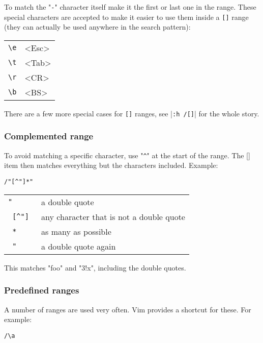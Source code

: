 To match the "\texttt{-}" character itself make it the first or last one in the range.
These special characters are accepted to make it easier to use them inside a \texttt{[]} range (they can actually be used anywhere in the search pattern):

\begin{center} \begin{tabular}{l l}
		\texttt{\textbackslash{}e} & <Esc> \\
		\texttt{\textbackslash{}t} & <Tab> \\
		\texttt{\textbackslash{}r} & <CR>  \\
		\texttt{\textbackslash{}b} & <BS>  \\
\end{tabular} \end{center}

There are a few more special cases for \texttt{[]} ranges, see |\texttt{:h /[]}| for the whole story.
\subsubsection{Complemented range}
To avoid matching a specific character, use "\texttt{\^{}}" at the start of the range.
The [] item then matches everything but the characters included.
Example:

\begin{Verbatim}[samepage=true]
 /"[^"]*"
\end{Verbatim}

\begin{center} \begin{tabular}{l l}
				\texttt{"      } & a double quote \\
				\texttt{ [\^{}"]  } & any character that is not a double quote \\
				\texttt{     * } & as many as possible \\
				\texttt{      "} & a double quote again \\
\end{tabular} \end{center}

This matches "foo" and "3!x", including the double quotes.
\subsubsection{Predefined ranges}
A number of ranges are used very often.
Vim provides a shortcut for these.
For example:

\begin{Verbatim}[samepage=true]
 /\a
\end{Verbatim}

